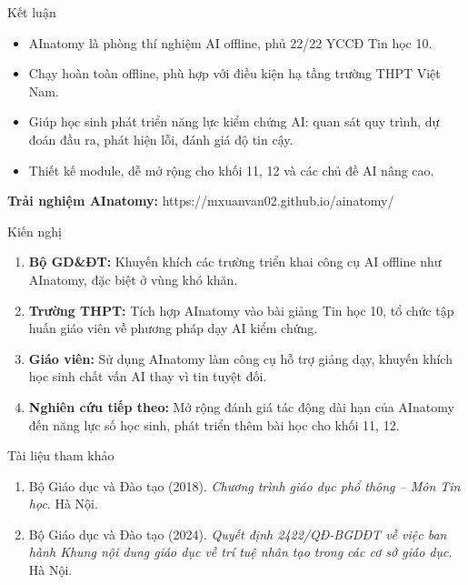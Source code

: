 \documentclass[10pt, aspectratio=169]{beamer}
\begin{document}
\begin{frame}{Kết luận}
    \begin{itemize}
        \item AInatomy là phòng thí nghiệm AI offline, phủ 22/22 YCCĐ Tin học 10.
        \item Chạy hoàn toàn offline, phù hợp với điều kiện hạ tầng trường THPT Việt Nam.
        \item Giúp học sinh phát triển năng lực kiểm chứng AI: quan sát quy trình, dự đoán đầu ra, phát hiện lỗi, đánh giá độ tin cậy.
        \item Thiết kế module, dễ mở rộng cho khối 11, 12 và các chủ đề AI nâng cao.
    \end{itemize}
    
    \vspace{0.5em}
    
    \centering
    \textbf{Trải nghiệm AInatomy:} https://mxuanvan02.github.io/ainatomy/
\end{frame}

\begin{frame}{Kiến nghị}
    \begin{enumerate}
        \item \textbf{Bộ GD\&ĐT:} Khuyến khích các trường triển khai công cụ AI offline như AInatomy, đặc biệt ở vùng khó khăn.
        \item \textbf{Trường THPT:} Tích hợp AInatomy vào bài giảng Tin học 10, tổ chức tập huấn giáo viên về phương pháp dạy AI kiểm chứng.
        \item \textbf{Giáo viên:} Sử dụng AInatomy làm công cụ hỗ trợ giảng dạy, khuyến khích học sinh chất vấn AI thay vì tin tuyệt đối.
        \item \textbf{Nghiên cứu tiếp theo:} Mở rộng đánh giá tác động dài hạn của AInatomy đến năng lực số học sinh, phát triển thêm bài học cho khối 11, 12.
    \end{enumerate}
\end{frame}

\begin{frame}{Tài liệu tham khảo}
    \small
    \begin{enumerate}
        \item Bộ Giáo dục và Đào tạo (2018). \textit{Chương trình giáo dục phổ thông -- Môn Tin học}. Hà Nội.
        \item Bộ Giáo dục và Đào tạo (2024). \textit{Quyết định 2422/QĐ-BGDĐT về việc ban hành Khung nội dung giáo dục về trí tuệ nhân tạo trong các cơ sở giáo dục}. Hà Nội.
    \end{enumerate}
\end{frame}
\end{document}
